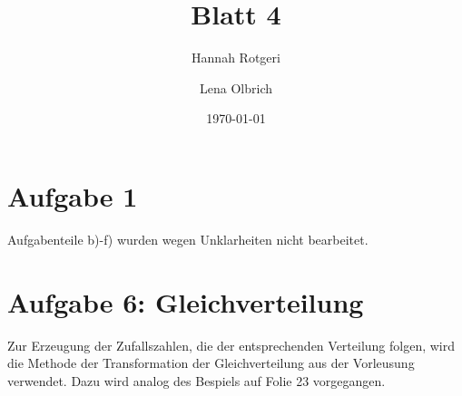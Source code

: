 \documentclass[11pt,a4paper]{article}
\title{Blatt 4}
\date{\today}
\author{Hannah Rotgeri \and Lena Olbrich}
\begin{document}
    \maketitle

    \section*{Aufgabe 1}
Aufgabenteile b)-f) wurden
wegen Unklarheiten nicht bearbeitet.




	\section*{Aufgabe 6: Gleichverteilung}

	Zur Erzeugung der Zufallszahlen, die der entsprechenden Verteilung folgen,
	wird die Methode der Transformation der Gleichverteilung aus der Vorleusung verwendet.
	Dazu wird analog des Bespiels auf Folie 23 vorgegangen.
\end{document}
